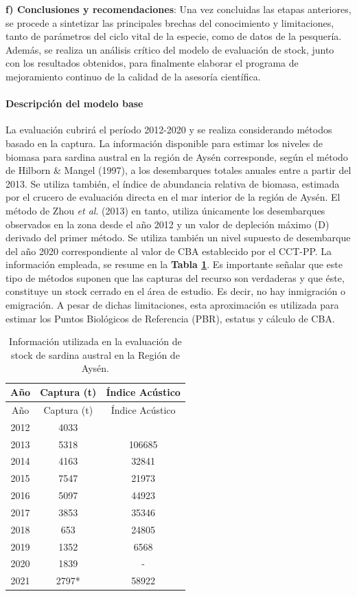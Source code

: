 \documentclass[
  spanish,
]{article}
\begin{document}
\textbf{f) Conclusiones y recomendaciones}: Una vez concluidas las
etapas anteriores, se procede a sintetizar las principales brechas del
conocimiento y limitaciones, tanto de parámetros del ciclo vital de la
especie, como de datos de la pesquería. Además, se realiza un análisis
crítico del modelo de evaluación de stock, junto con los resultados
obtenidos, para finalmente elaborar el programa de mejoramiento continuo
de la calidad de la asesoría científica.

\vspace{0.8cm}

\hypertarget{descripciuxf3n-del-modelo-base}{%
\paragraph{Descripción del modelo
base}\label{descripciuxf3n-del-modelo-base}}

\quad

La evaluación cubrirá el período 2012-2020 y se realiza considerando
métodos basado en la captura. La información disponible para estimar los
niveles de biomasa para sardina austral en la región de Aysén
corresponde, según el método de Hilborn \& Mangel (1997), a los
desembarques totales anuales entre a partir del 2013. Se utiliza
también, el índice de abundancia relativa de biomasa, estimada por el
crucero de evaluación directa en el mar interior de la región de Aysén.
El método de Zhou \emph{et al}. (2013) en tanto, utiliza únicamente los
desembarques observados en la zona desde el año 2012 y un valor de
depleción máximo (D) derivado del primer método. Se utiliza también un
nivel supuesto de desembarque del año 2020 correspondiente al valor de
CBA establecido por el CCT-PP. La información empleada, se resume en la
\textbf{Tabla \ref{Tab2}}. Es importante señalar que este tipo de
métodos suponen que las capturas del recurso son verdaderas y que éste,
constituye un stock cerrado en el área de estudio. Es decir, no hay
inmigración o emigración. A pesar de dichas limitaciones, esta
aproximación es utilizada para estimar los Puntos Biológicos de
Referencia (PBR), estatus y cálculo de CBA.

\begin{longtable}[]{@{}ccc@{}}
\caption{\label{Tab2} Información utilizada en la evaluación de stock de
sardina austral en la Región de Aysén.}\tabularnewline
\toprule
Año & Captura (t) & Índice Acústico\tabularnewline
\midrule
\endfirsthead
\toprule
Año & Captura (t) & Índice Acústico\tabularnewline
\midrule
\endhead
2012 & 4033 &\tabularnewline
2013 & 5318 & 106685\tabularnewline
2014 & 4163 & 32841\tabularnewline
2015 & 7547 & 21973\tabularnewline
2016 & 5097 & 44923\tabularnewline
2017 & 3853 & 35346\tabularnewline
2018 & 653 & 24805\tabularnewline
2019 & 1352 & 6568\tabularnewline
2020 & 1839 & -\tabularnewline
2021 & 2797* & 58922\tabularnewline
\bottomrule
\end{longtable}
\end{document}
